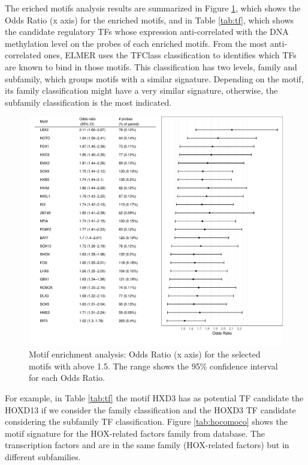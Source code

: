 The eriched motifs analysis results are summarized in Figure \ref{tab:or},
which shows the Odds Ratio (x axis) for the enriched motifs, and in Table  \ref{tab:tf},
which shows the candidate regulatory TFs whose expression anti-correlated
with the DNA methylation level on the probes of each enriched motifs.
 From the most anti-correlated ones, ELMER uses the TFClass
 classification \cite{doi:10.1093/nar/gku1064} to identifies
 which TFs are  known to bind in those motifs.
 This classification has two levels, family and subfamily,
  which groups motifs with a similar signature.
  Depending on the motif, its family classification might have a
  very similar signature, otherwise, the subfamily classification is the most indicated.

\begin{center}
\begin{figure}[h!]
\includegraphics[width=16cm]{images/hyper_motif_enrichment.pdf}
\caption[G-CIMP analysis: Odds Ratio plot]{\label{tab:or}Motif enrichment analysis: Odds Ratio (x axis) for the selected motifs with  above 1.5. The range shows the 95\% confidence interval for each Odds Ratio.}
\end{figure}

\end{center}


For example, in Table \ref{tab:tf} the motif HXD3 has as potential TF candidate the HOXD13 if we consider the family  classification and the HOXD3 TF candidate considering the subfamily TF classification. Figure \ref{tab:hocomoco} shows the motif signature for the HOX-related factors family from  database. The transcription factors  and  are in the same family (HOX-related factors) but in different subfamilies.



